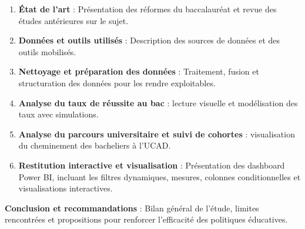 \begin{enumerate}
    \item \textbf{État de l’art} : Présentation des réformes du baccalauréat et revue des études antérieures sur le sujet.
    \item \textbf{Données et outils utilisés} : Description des sources de données et des outils mobilisés.
    \item \textbf{Nettoyage et préparation des données} : Traitement, fusion et structuration des données pour les rendre exploitables.
    \item \textbf{Analyse du taux de réussite au bac} : lecture visuelle et modélisation des taux avec simulations.
    \item \textbf{Analyse du parcours universitaire et suivi de cohortes} : visualisation du cheminement des bacheliers à l’UCAD.
    \item \textbf{Restitution interactive et visualisation} : Présentation des dashboard Power BI, incluant les filtres dynamiques, mesures, colonnes conditionnelles et visualisations interactives.
\end{enumerate}

\textbf{Conclusion et recommandations} : Bilan général de l’étude, limites rencontrées et propositions pour renforcer l’efficacité des politiques éducatives.